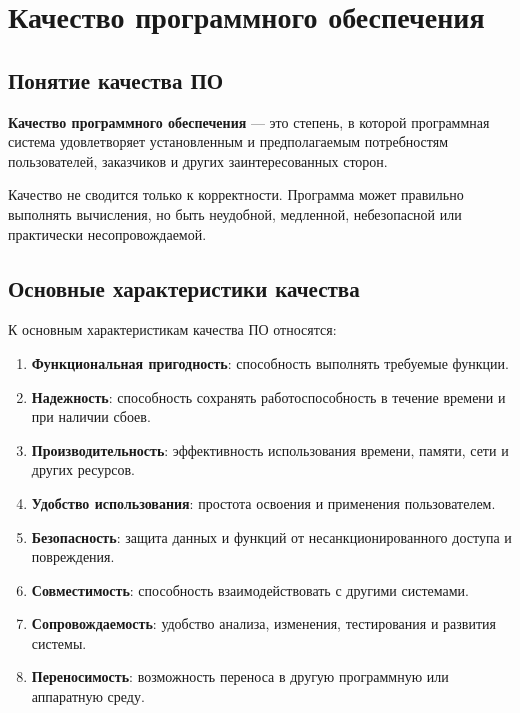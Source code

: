 \documentclass[12pt,a4paper]{article}
\begin{document}
\section{Качество программного обеспечения}

\subsection{Понятие качества ПО}

\textbf{Качество программного обеспечения} --- это степень, в которой программная система удовлетворяет установленным и предполагаемым потребностям пользователей, заказчиков и других заинтересованных сторон.

Качество не сводится только к корректности. Программа может правильно выполнять вычисления, но быть неудобной, медленной, небезопасной или практически несопровождаемой.

\subsection{Основные характеристики качества}

К основным характеристикам качества ПО относятся:

\begin{enumerate}
    \item \textbf{Функциональная пригодность}: способность выполнять требуемые функции.

    \item \textbf{Надежность}: способность сохранять работоспособность в течение времени и при наличии сбоев.

    \item \textbf{Производительность}: эффективность использования времени, памяти, сети и других ресурсов.

    \item \textbf{Удобство использования}: простота освоения и применения пользователем.

    \item \textbf{Безопасность}: защита данных и функций от несанкционированного доступа и повреждения.

    \item \textbf{Совместимость}: способность взаимодействовать с другими системами.

    \item \textbf{Сопровождаемость}: удобство анализа, изменения, тестирования и развития системы.

    \item \textbf{Переносимость}: возможность переноса в другую программную или аппаратную среду.
\end{enumerate}
\end{document}
